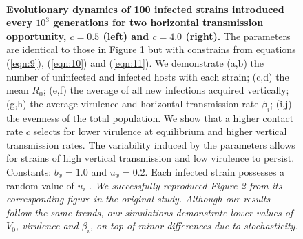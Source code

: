 \begin{figure}[tbph]
        \hfil
        \\[-2ex]
        \hfil
\captionsetup{width=1.2\linewidth}
\caption{\textbf{Evolutionary dynamics of 100 infected strains introduced every
$10^3$ generations for two horizontal transmission opportunity, $c = 0.5$ (left)
and $c = 4.0$ (right).} The parameters are identical to those in Figure 1 but
with constrains from equations (\ref{eqn:9}), (\ref{eqn:10}) and (\ref{eqn:11}).
We demonstrate (a,b) the number of uninfected and infected hosts with each
strain; (c,d) the mean $R_0$; (e,f) the average of all new infections acquired
vertically; (g,h) the average virulence and horizontal transmission rate
$\beta_i$; (i,j) the evenness of the total population. We show that a higher
contact rate $c$ selects for lower virulence at equilibrium and higher vertical
transmission rates. The variability induced by the parameters allows for strains
of high vertical transmission and low virulence to persist. Constants:
$b_x = 1.0$ and $u_x = 0.2$. Each infected strain possesses a random value of
$u_i$ \in [$u_x$, 1]. \textit{We successfully reproduced Figure 2 from its
corresponding figure in the original study. Although our results follow the
same trends, our simulations demonstrate lower values of $V_0$, virulence and
$\beta_i$, on top of minor differences due to stochasticity.}
}
\label{fig:figure2}
\end{figure}

